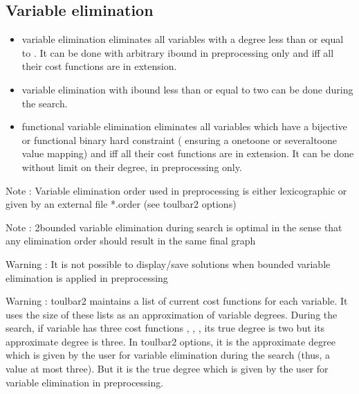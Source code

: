 \documentclass[letterpaper,10pt,openany,oneside,english]{sphinxmanual}
\begin{document}
\subsection{Variable elimination}
\label{\detokenize{ref/ref_modules:variable-elimination}}

\begin{fulllineitems}

\pysigstartsignatures
{}
\pysigstopsignatures
\sphinxAtStartPar
\begin{itemize}
\item {} 
\sphinxAtStartPar
{} variable elimination eliminates all variables with a degree less than or equal to . It can be done with arbitrary i\sphinxhyphen{}bound in preprocessing only and iff all their cost functions are in extension.

\item {} 
\sphinxAtStartPar
{} variable elimination with i\sphinxhyphen{}bound less than or equal to two can be done during the search.

\item {} 
\sphinxAtStartPar
functional variable elimination eliminates all variables which have a bijective or functional binary hard constraint ( ensuring a one\sphinxhyphen{}to\sphinxhyphen{}one or several\sphinxhyphen{}to\sphinxhyphen{}one value mapping) and iff all their cost functions are in extension. It can be done without limit on their degree, in preprocessing only.

\end{itemize}


\sphinxAtStartPar
Note : Variable elimination order used in preprocessing is either lexicographic or given by an external file *.order (see toulbar2 options)

\sphinxAtStartPar
Note : 2\sphinxhyphen{}bounded variable elimination during search is optimal in the sense that any elimination order should result in the same final graph

\sphinxAtStartPar
Warning : It is not possible to display/save solutions when bounded variable elimination is applied in preprocessing

\sphinxAtStartPar
Warning : toulbar2 maintains a list of current cost functions for each variable. It uses the size of these lists as an approximation of variable degrees. During the search, if variable  has three cost functions , , , its true degree is two but its approximate degree is three. In toulbar2 options, it is the approximate degree which is given by the user for variable elimination during the search (thus, a value at most three). But it is the true degree which is given by the user for variable elimination in preprocessing. 

\end{fulllineitems}
\end{document}
